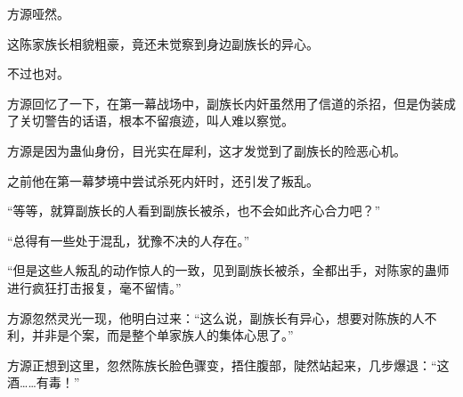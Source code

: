 \begin{this_body}
方源哑然。

这陈家族长相貌粗豪，竟还未觉察到身边副族长的异心。

不过也对。

方源回忆了一下，在第一幕战场中，副族长内奸虽然用了信道的杀招，但是伪装成了关切警告的话语，根本不留痕迹，叫人难以察觉。

方源是因为蛊仙身份，目光实在犀利，这才发觉到了副族长的险恶心机。

之前他在第一幕梦境中尝试杀死内奸时，还引发了叛乱。

“等等，就算副族长的人看到副族长被杀，也不会如此齐心合力吧？”

“总得有一些处于混乱，犹豫不决的人存在。”

“但是这些人叛乱的动作惊人的一致，见到副族长被杀，全都出手，对陈家的蛊师进行疯狂打击报复，毫不留情。”

方源忽然灵光一现，他明白过来：“这么说，副族长有异心，想要对陈族的人不利，并非是个案，而是整个单家族人的集体心思了。”

方源正想到这里，忽然陈族长脸色骤变，捂住腹部，陡然站起来，几步爆退：“这酒……有毒！”

\end{this_body}

